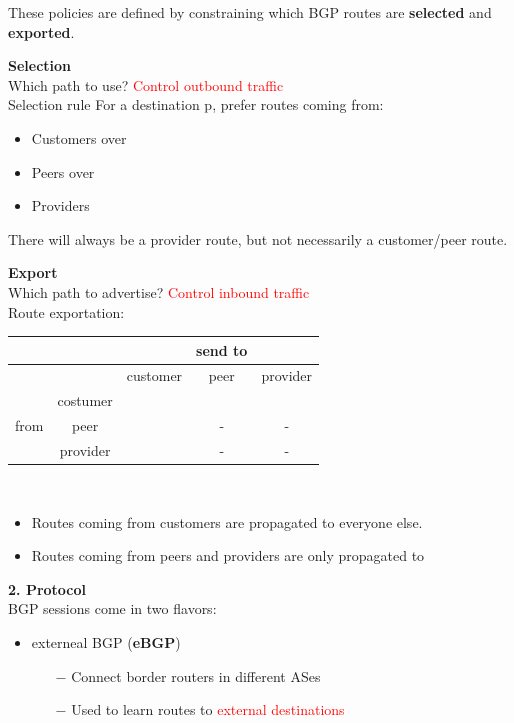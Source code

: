 \documentclass[a4paper, fontsize=8pt, landscape, DIV=1]{scrartcl}
\begin{document}
\begin{multicols*}{4}
		These policies are defined by constraining which BGP routes are
		\textbf{selected} and \textbf{exported}.\par 
		
		\textbf{Selection}\\
		Which path to use? \textcolor{Red}{Control outbound traffic}\\
		Selection rule For a destination p, prefer routes coming from: 
		\begin{itemize}[noitemsep]
			\item Customers over 
			\item Peers over 
			\item Providers
		\end{itemize}
		There will always be a provider route, but not necessarily a customer/peer
		route.\par 
		
		\textbf{Export}\\
		Which path to advertise? \textcolor{Red}{Control inbound traffic}\\
		Route exportation:\\
		\begin{tabular}{c | c c c c} 
			&  &  & send to &  \\ 
			\hline
			&  & customer & peer & provider \\ 
			& costumer & \checkmark & \checkmark & \checkmark \\ 
			from & peer & \checkmark & - & - \\ 
			& provider & \checkmark & - & - \\ 
		\end{tabular} \\
		\vspace{-0.2cm}
		\begin{itemize}[noitemsep]
			\item  Routes coming from customers are propagated to everyone else.
			\item  Routes coming from peers and providers are only propagated to
		\end{itemize}
		\par
		
		\textbf{2. Protocol}\\
		BGP sessions come in two flavors: 
		\begin{itemize}[noitemsep]
			\item externeal BGP (\textbf{eBGP})
			\begin{itemize}
				\item[$-$] Connect border routers in different ASes
				\item[$-$] Used to learn routes to \textcolor{Red}{external destinations}\\
				

\end{itemize}
\end{itemize}
\end{multicols*}
\end{document}
